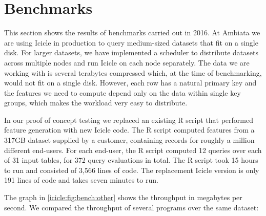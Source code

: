 \section{Benchmarks}
\label{icicle:s:Benchmarks}

This section shows the results of benchmarks carried out in 2016.
At Ambiata we are using Icicle in production to query medium-sized datasets that fit on a single disk.
For larger datasets, we have implemented a scheduler to distribute datasets across multiple nodes and run Icicle on each node separately.
The data we are working with is several terabytes compressed which, at the time of benchmarking, would not fit on a single disk.
However, each row has a natural primary key and the features we need to compute depend only on the data within single key groups, which makes the workload very easy to distribute.


In our proof of concept testing we replaced an existing R script that performed feature generation with new Icicle code.
The R script computed features from a 317GB dataset supplied by a customer, containing records for roughly a million different end-users.
For each end-user, the R script computed 12 queries over each of 31 input tables, for 372 query evaluations in total.
The R script took 15 hours to run and consisted of 3,566 lines of code.
The replacement Icicle version is only 191 lines of code and takes seven minutes to run.



The graph in \cref{icicle:fig:bench:other} shows the throughput in megabytes per second.
We compared the throughput of several programs over the same dataset:

